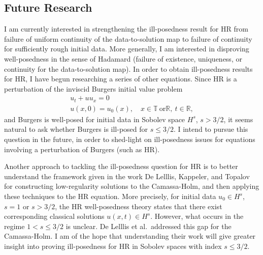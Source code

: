 \documentclass[12pt,reqno]{amsart}
\newcommand{\rr}{\mathbb{R}}
\newcommand{\ci}{\mathbb{T}}
\begin{document}
\subsection{Future Research} 
\label{ssec:fut-res}
I am currently
interested in strengthening the ill-posedness result for HR from failure of
uniform continuity of the data-to-solution map to failure of continuity for
sufficiently rough initial data. More generally, I am interested in disproving
well-posedness in the sense of Hadamard (failure of existence, uniqueness, or
continuity for the data-to-solution map). In order to obtain ill-posedness
results for HR, I have begun researching a series of other equations. Since HR is a perturbation of the
inviscid Burgers initial value problem 
\begin{gather*}
    u_{t} + u u_{x} = 0
    \\
    u(x, 0) = u_{0}(x), \quad x \in \ci \ \text{or} \rr, \ t \in \rr,
\end{gather*}
and Burgers is well-posed for initial data in Sobolev space $H^{s}$, $s > 3/2$,
it seems natural to ask whether Burgers is ill-posed for $s \le 3/2$. I intend to
pursue this question in the future, in order to shed-light on ill-posedness
issues for equations involving a perturbation of Burgers (such as HR).

Another approach to tackling the ill-posedness question for HR
is to better understand the framework given in the work De Lelllis,
Kappeler, and Topalov \cite{Lellis_2007_Low-regularity-} for constructing
low-regularity solutions to the Camassa-Holm, and then applying these techniques
to the HR equation. More precisely, for initial data $u_{0} \in H^{s}$, $s =1$
or $s > 3/2$, the HR well-posedness theory states that there exist corresponding
classical solutions $u(x,t) \in H^{s}$. However, what occurs in the regime $1 <
s \le 3/2$ is unclear. De Lelllis et al.\ addressed this gap for the
Camassa-Holm. I am of the hope that understanding their work will give greater
insight into proving ill-posedness for HR in Sobolev spaces with index $s \le
3/2$. 
\end{document}
